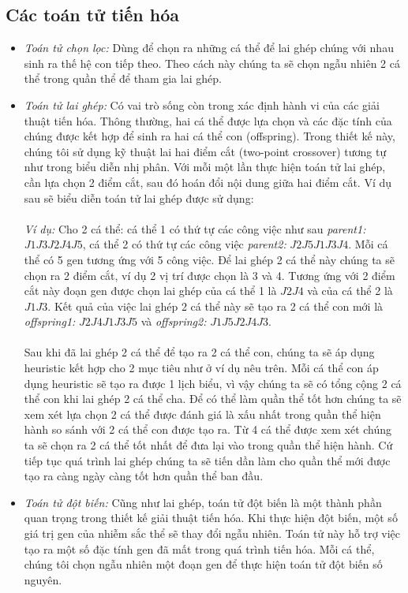\documentclass[a4paper,12pt]{article}
\begin{document}
\subsection{Các toán tử tiến hóa}
\begin{itemize}
\item
\textit{Toán tử chọn lọc:} Dùng để chọn ra những cá thể để lai ghép chúng với nhau sinh ra thế hệ con tiếp theo. Theo cách này chúng ta sẽ chọn ngẫu nhiên 2 cá thể trong quần thể để tham gia lai ghép.
\item
\textit{Toán tử lai ghép:} Có vai trò sống còn trong xác định hành vi của các giải thuật tiến hóa. Thông thường, hai cá thể được lựa chọn và các đặc tính của chúng được kết hợp để sinh ra hai cá thể con (offspring). Trong thiết kế này, chúng tôi sử dụng kỹ thuật lai hai điểm cắt (two-point crossover) tương tự như trong biểu diễn nhị phân. Với mỗi một lần thực hiện toán tử lai ghép, cần lựa chọn 2 điểm cắt, sau đó hoán đổi nội dung giữa hai điểm cắt. Ví dụ sau sẽ biểu diễn toán tử lai ghép được sử dụng:\\\\
\textit{Ví dụ:} Cho 2 cá thể: cá thể 1 có thứ tự các công việc như sau \textit{parent1:} $J1 J3 J2 J4 J5$, cá thể 2 có thứ tự các công việc \textit{parent2:} $J2 J5 J1 J3 J4$. Mỗi cá thể có 5 gen tương ứng với 5 công việc. Để lai ghép 2 cá thể này chúng ta sẽ chọn ra 2 điểm cắt, ví dụ 2 vị trí được chọn là 3 và 4. Tương ứng với 2 điểm cắt này đoạn gen được chọn lai ghép của cá thể 1 là $J2 J4$ và của cá thể 2 là $J1 J3$. Kết quả của việc lai ghép 2 cá thể này sẽ tạo ra 2 cá thể con mới là \textit{offspring1:} $J2 J4 J1 J3 J5$ và \textit{offspring2:} $J1 J5 J2 J4 J3$.\\\\
Sau khi đã lai ghép 2 cá thể để tạo ra 2 cá thể con, chúng ta sẽ áp dụng heuristic kết hợp cho 2 mục tiêu như ở ví dụ nêu trên. Mỗi cá thể con áp dụng heuristic sẽ tạo ra được 1 lịch biểu, vì vậy chúng ta sẽ có tổng cộng 2 cá thể con khi lai ghép 2 cá thể cha. Để có thể làm quần thể tốt hơn chúng ta sẽ xem xét lựa chọn 2 cá thể được đánh giá là xấu nhất trong quần thể hiện hành so sánh với 2 cá thể con được tạo ra. Từ 4 cá thể được xem xét chúng ta sẽ chọn ra 2 cá thể tốt nhất để đưa lại vào trong quần thể hiện hành. Cứ tiếp tục quá trình lai ghép chúng ta sẽ tiến dần làm cho quần thể mới được tạo ra càng ngày càng tốt hơn quần thể ban đầu.
\item
\textit{Toán tử đột biến:} Cũng như lai ghép, toán tử đột biến là một thành phần quan trọng trong thiết kế giải thuật tiến hóa. Khi thực hiện đột biến, một số giá trị gen của nhiễm sắc thể sẽ thay đổi ngẫu nhiên. Toán tử này hỗ trợ việc tạo ra một số đặc tính gen đã mất trong quá trình tiến hóa. Mỗi cá thể, chúng tôi chọn ngẫu nhiên một đoạn gen để thực hiện toán tử đột biến số nguyên.\\\\

\end{itemize}
\end{document}
